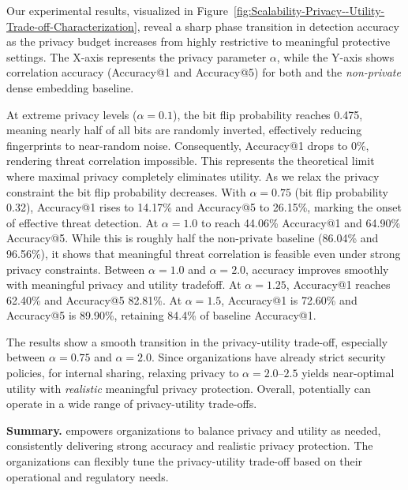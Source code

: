 Our experimental results, visualized in Figure~\ref{fig:Scalability-Privacy--Utility-Trade-off-Characterization}, reveal a sharp phase transition in detection accuracy as the privacy budget increases from highly restrictive to meaningful protective settings. The X-axis represents the privacy parameter $\alpha$, while the Y-axis shows correlation accuracy (Accuracy@1 and Accuracy@5) for both \tool and the \emph{non-private} dense embedding baseline.

At extreme privacy levels ($\alpha = 0.1$), the bit flip probability reaches 0.475, meaning nearly half of all bits are randomly inverted, effectively reducing fingerprints to near-random noise.
Consequently, Accuracy@1 drops to 0\%, rendering threat correlation impossible.
This represents the theoretical limit where maximal privacy completely eliminates utility. As we relax the privacy constraint the bit flip probability decreases.
With $\alpha = 0.75$ (bit flip probability 0.32), Accuracy@1 rises to 14.17\% and Accuracy@5 to 26.15\%, marking the onset of effective threat detection.
At $\alpha = 1.0$  \tool to reach 44.06\% Accuracy@1 and 64.90\% Accuracy@5.
While this is roughly half the non-private baseline (86.04\% and 96.56\%), it shows that meaningful threat correlation is feasible even under strong privacy constraints.
Between $\alpha = 1.0$ and $\alpha = 2.0$, accuracy improves smoothly with meaningful privacy and utility tradefoff.
At $\alpha = 1.25$, Accuracy@1 reaches 62.40\% and Accuracy@5 82.81\%.
At $\alpha = 1.5$, Accuracy@1 is 72.60\% and Accuracy@5 is 89.90\%, retaining 84.4\% of baseline Accuracy@1.


The results show a smooth transition in the privacy-utility trade-off, especially between $\alpha = 0.75$ and $\alpha = 2.0$.
Since organizations have already strict security policies, for internal sharing, relaxing privacy to $\alpha = 2.0$--$2.5$ yields near-optimal utility with \emph{realistic} meaningful privacy protection. Overall, \tool potentially can operate in a wide range of privacy-utility trade-offs.

\begin{tcolorbox}[colback=white, colframe=black,  left=0pt, right=0pt, top=0pt, bottom=0pt]
    \textbf{Summary.} \tool empowers organizations to balance privacy and utility as needed, consistently delivering strong accuracy and realistic privacy protection. The organizations can flexibly tune the privacy-utility trade-off based on their operational and regulatory needs.
\end{tcolorbox}

